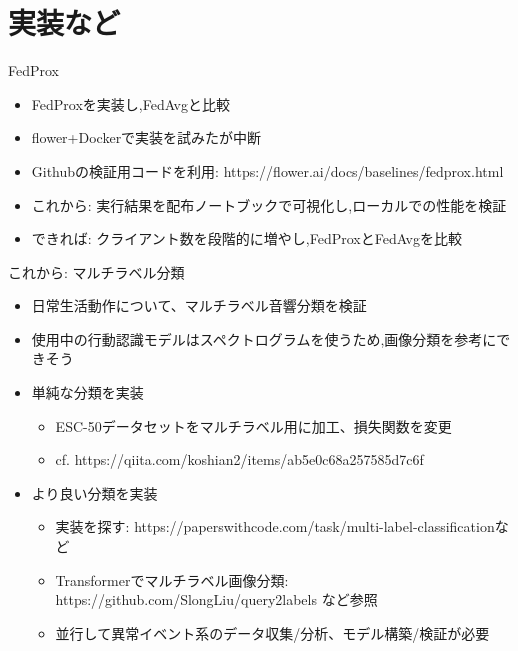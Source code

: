 \documentclass[unicode,12pt,aspectratio=169,dvipdfmx]{beamer}
\begin{document}
\section{実装など}
\begin{frame}{FedProx\cite{FedProx}}
\begin{itemize}
    \item FedProxを実装し,FedAvgと比較
    \item flower+Dockerで実装を試みたが中断
    \item Githubの検証用コードを利用: https://flower.ai/docs/baselines/fedprox.html
    \item これから: 実行結果を配布ノートブックで可視化し,ローカルでの性能を検証
    \item できれば: クライアント数を段階的に増やし,FedProxとFedAvgを比較 
\end{itemize}
\end{frame}

\begin{frame}{これから: マルチラベル分類}
\begin{itemize}
    \item 日常生活動作について、マルチラベル音響分類を検証
    \item 使用中の行動認識モデルはスペクトログラムを使うため,画像分類を参考にできそう
    \item 単純な分類を実装
    \begin{itemize}
        \item ESC-50データセットをマルチラベル用に加工、損失関数を変更
        \item cf. https://qiita.com/koshian2/items/ab5e0c68a257585d7c6f
    \end{itemize}
    \item より良い分類を実装
    \begin{itemize}
        \item 実装を探す: https://paperswithcode.com/task/multi-label-classificationなど
        \item Transformerでマルチラベル画像分類: https://github.com/SlongLiu/query2labels など参照
        \item 並行して異常イベント系のデータ収集/分析、モデル構築/検証が必要
    \end{itemize}
\end{itemize}
\end{frame}
\end{document}
